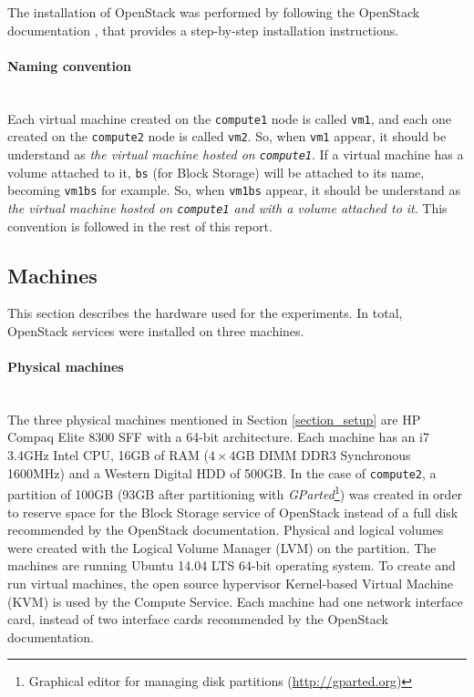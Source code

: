 The installation of OpenStack was performed by following the OpenStack documentation \cite{osinstall}, that provides a step-by-step installation instructions.


\paragraph{Naming convention}\mbox{}\\
Each virtual machine created on the \texttt{compute1} node is called \texttt{vm1}, and each one created on the \texttt{compute2} node is called \texttt{vm2}. 
So, when \texttt{vm1} appear, it should be understand as \textit{the virtual machine hosted on \texttt{compute1}}.
If a virtual machine has a volume attached to it, \texttt{bs} (for Block Storage) will be attached to its name, becoming \texttt{vm1bs} for example. 
So, when \texttt{vm1bs} appear, it should be understand as \textit{the virtual machine hosted on \texttt{compute1} and with a volume attached to it}.
This convention is followed in the rest of this report.


\subsection{Machines}
This section describes the hardware used for the experiments.
In total, OpenStack services were installed on three machines.


\paragraph{Physical machines}\mbox{}\\
The three physical machines mentioned in Section \ref{section_setup} are HP Compaq Elite 8300 SFF with a 64-bit architecture. 
Each machine has an i7 3.4GHz Intel CPU, 16GB of RAM ($4\times4$GB DIMM DDR3 Synchronous 1600MHz) and a Western Digital HDD of 500GB. 
In the case of \texttt{compute2}, a partition of 100GB (93GB after partitioning with \textit{GParted}\footnote{Graphical editor for managing disk partitions (\url{http://gparted.org})}) was created in order to reserve space for the Block Storage service of OpenStack instead of a full disk recommended by the OpenStack documentation. 
Physical and logical volumes were created with the Logical Volume Manager (LVM) on the partition.
The machines are running Ubuntu 14.04 LTS 64-bit operating system. 
To create and run virtual machines, the open source hypervisor Kernel-based Virtual Machine (KVM) is used by the Compute Service. Each machine had one network interface card, instead of two interface cards recommended by the OpenStack documentation.


